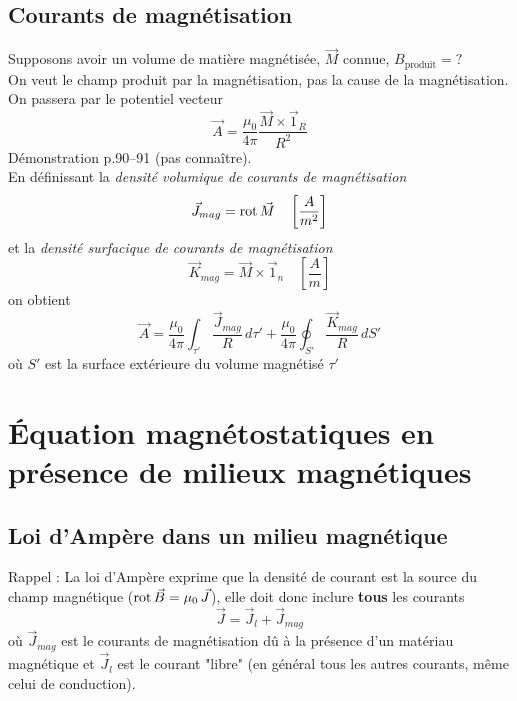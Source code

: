 \documentclass[british,french,11pt, a4paper, openany]{book}
\begin{document}
		\subsection{Courants de magnétisation}
		Supposons avoir un volume de matière magnétisée, $\vec M$ connue, $B_{\text{produit}}=?$\\
		On veut le champ produit par la magnétisation, pas la cause de la magnétisation. On passera par le potentiel vecteur \begin{equation}
		\vec A=\frac{\mu_0}{4\pi}\frac{\vec M\times \vec 1_R}{R^2}
		\end{equation}
		Démonstration p.90--91 (pas connaître).\\
		En définissant la \textit{densité volumique de courants de magnétisation} \begin{equation}
		\vec J_{mag}=\text{rot}\,\vec M\quad\left[\frac{A}{m^2}\right]
		\end{equation}
		et la \textit{densité surfacique de courants de magnétisation}
		\begin{equation}
		\vec K_{mag}=\vec M\times\vec 1_n\quad\left[\frac{A}{m}\right]
		\end{equation}
		on obtient
		\begin{equation}
		\vec A=\frac{\mu_0}{4\pi}\int_{\tau'}\frac{\vec J_{mag}}{R}\,d\tau'+\frac{\mu_0}{4\pi}\oint_{S'}\frac{\vec K_{mag}}{R}\,dS'
		\end{equation}
		où $S'$ est la surface extérieure du volume magnétisé $\tau'$
		\section{Équation magnétostatiques en présence de milieux magnétiques}
		\subsection{Loi d'Ampère dans un milieu magnétique}
		Rappel : La loi d'Ampère exprime que la densité de courant est la source du champ magnétique ($\text{rot}\,\vec B=\mu_0\,\vec J$), elle doit donc inclure \textbf{tous} les courants
		\begin{equation}
		\vec J=\vec J_{l}+\vec J_{mag}
		\end{equation}
		où $\vec J_{mag}$ est le courants de magnétisation dû à la présence d'un matériau magnétique et $\vec J_{l}$ est le courant "libre" (en général tous les autres courants, même celui de conduction).\\
		
\end{document}
